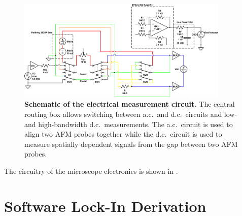 \documentclass[12pt, a4paper, twoside]{book}
\begin{document}
\begin{figure}[bt]
\centering
\includegraphics[width=0.9\textwidth]{figures/tip_experiment_circuit_design}
\caption[Schematic of the electrical measurement circuit.]{\textbf{Schematic of the electrical measurement circuit.} The central routing box allows switching between a.c.\ and d.c.\ circuits and low-and high-bandwidth d.c.\ measurements. The a.c.\ circuit is used to align two AFM probes together while the d.c.\ circuit is used to measure spatially dependent signals from the gap between two AFM probes.}
\label{fig:circuit_design}
\end{figure}

The circuitry of the microscope electronics is shown in .

\section{Software Lock-In Derivation}
\end{document}
